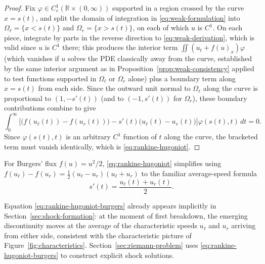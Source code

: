 \begin{proof}
Fix $\varphi \in C_c^1(\mathbb{R}\times(0,\infty))$ supported in a region
crossed by the curve $x=s(t)$, and split the domain of integration in
\eqref{eq:weak-formulation} into $\Omega_\ell = \{x<s(t)\}$ and
$\Omega_r=\{x>s(t)\}$, on each of which $u$ is $C^1$. On each piece,
integrate by parts in the reverse direction to
\eqref{eq:weak-derivation}, which is valid since $u$ is $C^1$ there; this
produces the interior term $\iint (u_t+f(u)_x)\varphi$ (which vanishes if
$u$ solves the PDE classically away from the curve, established by the
same interior argument as in Proposition~\ref{prop:weak-consistency}
applied to test functions supported in $\Omega_\ell$ or $\Omega_r$ alone)
plus a boundary term along $x=s(t)$ from each side. Since the outward
unit normal to $\Omega_\ell$ along the curve is proportional to $(1,
-s'(t))$ (and to $(-1,s'(t))$ for $\Omega_r$), these boundary
contributions combine to give
\begin{equation}
  \int_0^\infty \Big[ \big(f(u_\ell(t)) - f(u_r(t))\big) - s'(t)\big(u_\ell(t)-u_r(t)\big) \Big] \varphi(s(t),t)\, dt = 0.
\end{equation}
Since $\varphi(s(t),t)$ is an arbitrary $C^1$ function of $t$ along the
curve, the bracketed term must vanish identically, which is
\eqref{eq:rankine-hugoniot}.
\end{proof}

For Burgers' flux $f(u)=u^2/2$, \eqref{eq:rankine-hugoniot} simplifies
using $f(u_\ell)-f(u_r) = \tfrac12(u_\ell-u_r)(u_\ell+u_r)$ to the
familiar average-speed formula
\begin{equation}
  \label{eq:rankine-hugoniot-burgers}
  s'(t) = \frac{u_\ell(t) + u_r(t)}{2}.
\end{equation}

\begin{remark}
Equation \eqref{eq:rankine-hugoniot-burgers} already appears implicitly
in Section~\ref{sec:shock-formation}: at the moment of first breakdown,
the emerging discontinuity moves at the average of the characteristic
speeds $u_\ell$ and $u_r$ arriving from either side, consistent with the
characteristic picture of Figure~\ref{fig:characteristics}.
Section~\ref{sec:riemann-problem} uses \eqref{eq:rankine-hugoniot-burgers}
to construct explicit shock solutions.
\end{remark}